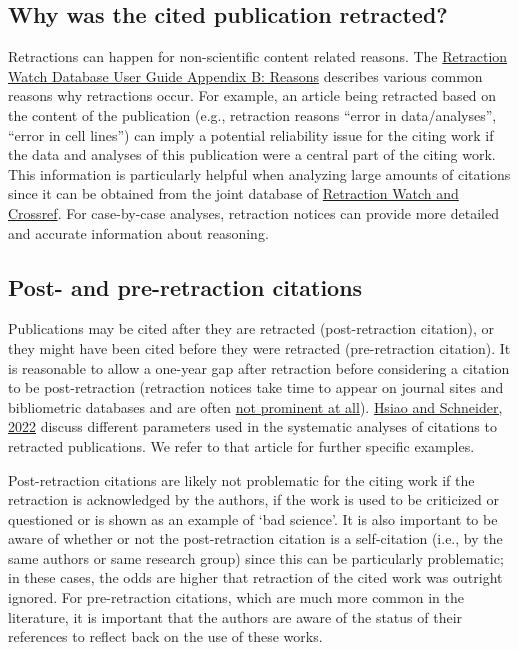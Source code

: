\documentclass[letterpaper, 12pt]{article}
\begin{document}
\subsection*{Why was the cited publication retracted?} 

Retractions can happen for non-scientific content related reasons. %
The \href{https://retractionwatch.com/retraction-watch-database-user-guide/retraction-watch-database-user-guide-appendix-b-reasons/}{Retraction Watch Database User Guide Appendix B: Reasons} describes various common reasons why retractions occur. For example, an article being retracted based on the content of the publication (e.g., retraction reasons ``error in data/analyses'', ``error in cell lines'') can imply a potential reliability issue for the citing work if the data and analyses of this publication were a central part of the citing work. This information is particularly helpful when analyzing large amounts of citations since it can be obtained from the joint database of \href{https://gitlab.com/crossref/retraction-watch-data}{Retraction Watch and Crossref}. For case-by-case analyses, retraction notices can provide more detailed and accurate information about reasoning. 

\subsection*{Post- and pre-retraction citations}

Publications may be cited after they are retracted (post-retraction citation), or they might have been cited before they were retracted (pre-retraction citation). 
It is reasonable to allow a one-year gap after retraction before considering a citation to be post-retraction (retraction notices take time to appear on journal sites and bibliometric databases and are often \href{https://retractionwatch.com/2024/07/05/how-you-can-help-improve-the-visibility-of-retractions-introducing-nisos-recommended-practice-for-communication-of-retractions-removals-and-expressions-of-concern-crec/}{not prominent at all}). \href{https://doi.org/10.1162/qss_a_00155}{Hsiao and Schneider, 2022} discuss different parameters used in the systematic analyses of citations to retracted publications. We refer to that article for further specific examples.  

Post-retraction citations are likely not problematic for the citing work if the retraction is acknowledged by the authors, if the work is used to be criticized or questioned or is shown as an example of `bad science'. It is also important to be aware of whether or not the post-retraction citation is a self-citation (i.e., by the same authors or same research group) since this can be particularly problematic; in these cases, the odds are higher that retraction of the cited work was outright ignored. For pre-retraction citations, which are much more common in the literature, it is important that the authors are aware of the status of their references to reflect back on the use of these works. 
\end{document}
